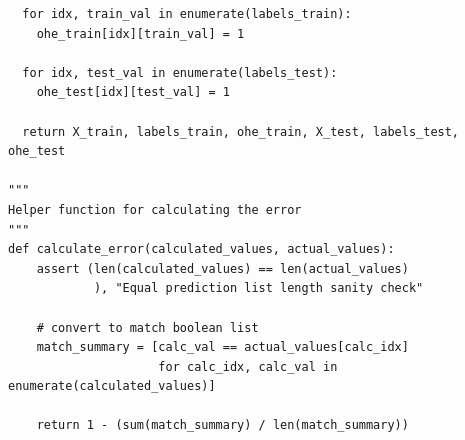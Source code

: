 \documentclass{article}
\newcommand{\1}{\mathbf{1}}
\begin{document}
{\begin{verbatim}
  for idx, train_val in enumerate(labels_train):
    ohe_train[idx][train_val] = 1

  for idx, test_val in enumerate(labels_test):
    ohe_test[idx][test_val] = 1

  return X_train, labels_train, ohe_train, X_test, labels_test, ohe_test

"""
Helper function for calculating the error
"""
def calculate_error(calculated_values, actual_values):
    assert (len(calculated_values) == len(actual_values)
            ), "Equal prediction list length sanity check"
    
    # convert to match boolean list
    match_summary = [calc_val == actual_values[calc_idx]
                     for calc_idx, calc_val in enumerate(calculated_values)]

    return 1 - (sum(match_summary) / len(match_summary))


\end{verbatim}

}
\end{document}
